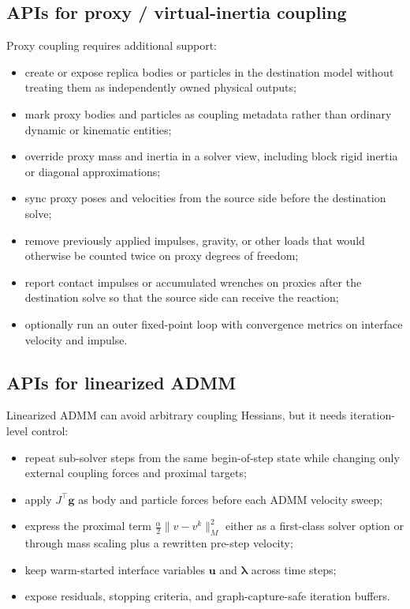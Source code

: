 \documentclass[11pt]{article}
\newcommand{\uu}{\bm u}
\newcommand{\lam}{\bm\lambda}
\begin{document}
\subsection{APIs for proxy / virtual-inertia coupling}

Proxy coupling requires additional support:
\begin{itemize}
\item create or expose replica bodies or particles in the destination model without
      treating them as independently owned physical outputs;
\item mark proxy bodies and particles as coupling metadata rather than ordinary
      dynamic or kinematic entities;
\item override proxy mass and inertia in a solver view, including block rigid inertia
      or diagonal approximations;
\item sync proxy poses and velocities from the source side before the destination
      solve;
\item remove previously applied impulses, gravity, or other loads that would otherwise
      be counted twice on proxy degrees of freedom;
\item report contact impulses or accumulated wrenches on proxies after the destination
      solve so that the source side can receive the reaction;
\item optionally run an outer fixed-point loop with convergence metrics on interface
      velocity and impulse.
\end{itemize}

\subsection{APIs for linearized ADMM}

Linearized ADMM can avoid arbitrary coupling Hessians, but it needs iteration-level
control:
\begin{itemize}
\item repeat sub-solver steps from the same begin-of-step state while changing only
      external coupling forces and proximal targets;
\item apply $J^\top\bm g$ as body and particle forces before each ADMM velocity sweep;
\item express the proximal term
      $\frac{\alpha}{2}\|v-v^k\|_M^2$ either as a first-class solver option or through
      mass scaling plus a rewritten pre-step velocity;
\item keep warm-started interface variables $\uu$ and $\lam$ across time steps;
\item expose residuals, stopping criteria, and graph-capture-safe iteration buffers.
\end{itemize}
\end{document}

